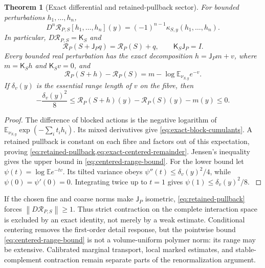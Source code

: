 \documentclass[11pt,oneside,openany]{book}
\newtheorem{theorem}{Theorem}[chapter]
\theoremstyle{definition}
\theoremstyle{remark}
\newcommand{\E}{\mathbb E}
\newcommand{\norm}[1]{\left\lVert#1\right\rVert}
\newcommand{\src}[2]{\cite[#2]{#1}}
\begin{document}
\begin{theorem}[Exact differential and retained-pullback sector]
\label{thm:exact-block-differential}
For bounded perturbations $h_1,\ldots,h_n$,
\begin{equation}\label{eq:exact-block-cumulants}
D^n\mathcal R_{P,S}[h_1,\ldots,h_n](y)
=(-1)^{n-1}\kappa_{S,y}(h_1,\ldots,h_n).
\end{equation}
In particular, $D\mathcal R_{P,S}=\mathsf K_S$ and
\begin{equation}\label{eq:retained-pullback}
\mathcal R_P(S+\mathsf J_Pq)=\mathcal R_P(S)+q,
\qquad \mathsf K_S\mathsf J_P=I.
\end{equation}
Every bounded real perturbation has the exact decomposition
$h=\mathsf J_Pm+v$, where $m=\mathsf K_Sh$ and $\mathsf K_Sv=0$, and
\begin{equation}\label{eq:exact-centered-remainder}
\mathcal R_P(S+h)-\mathcal R_P(S)
=m-\log\E_{\nu_{S,y}}e^{-v}.
\end{equation}
If $\delta_v(y)$ is the essential range length of $v$ on the fibre,
then
\begin{equation}\label{eq:centered-range-bound}
-\frac{\delta_v(y)^2}{8}
\le\mathcal R_P(S+h)(y)-\mathcal R_P(S)(y)-m(y)\le0.
\end{equation}
\end{theorem}
\begin{proof}
The difference of blocked actions is the negative logarithm of
$\E_{\nu_{S,y}}\exp(-\sum_i t_i h_i)$. Its mixed derivatives give
\cref{eq:exact-block-cumulants}. A retained pullback is constant on each
fibre and factors out of this expectation, proving
\cref{eq:retained-pullback,eq:exact-centered-remainder}. Jensen's
inequality gives the upper bound in \cref{eq:centered-range-bound}.
For the lower bound let $\psi(t)=\log\E e^{-tv}$. Its tilted variance
obeys $\psi''(t)\le\delta_v(y)^2/4$, while
$\psi(0)=\psi'(0)=0$. Integrating twice up to $t=1$ gives
$\psi(1)\le\delta_v(y)^2/8$. \src{F7}{V99}
\end{proof}

If the chosen fine and coarse norms make $\mathsf J_P$ isometric,
\cref{eq:retained-pullback} forces
$\norm{D\mathcal R_{P,S}}\ge1$. Thus strict contraction on the complete
interaction space is excluded by an exact identity, not merely by a
weak estimate. Conditional centering removes the first-order detail
response, but the pointwise bound \cref{eq:centered-range-bound} is not
a volume-uniform polymer norm: its range may be extensive. Calibrated
marginal transport, local marked estimates, and stable-complement
contraction remain separate parts of the renormalization argument.
\end{document}
